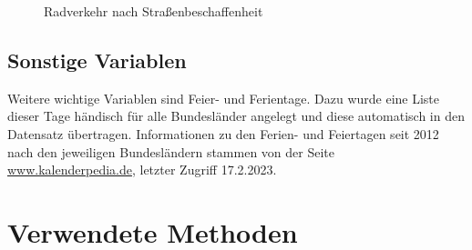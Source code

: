 \documentclass[a4paper,12pt]{thesis}
\begin{document}
\begin{figure}[!ht]%
	\centering
	\qquad
	\caption{Radverkehr nach Straßenbeschaffenheit}
	\label{VerkehrnachTypen}%
\end{figure}

\section{Sonstige Variablen}

Weitere wichtige Variablen sind Feier- und Ferientage. Dazu wurde eine Liste dieser Tage händisch für alle Bundesländer angelegt und diese automatisch in den Datensatz übertragen. Informationen zu den Ferien- und Feiertagen seit 2012 nach den jeweiligen Bundesländern stammen von der Seite \url{www.kalenderpedia.de}, letzter Zugriff 17.2.2023.

\chapter{Verwendete Methoden}
\end{document}
